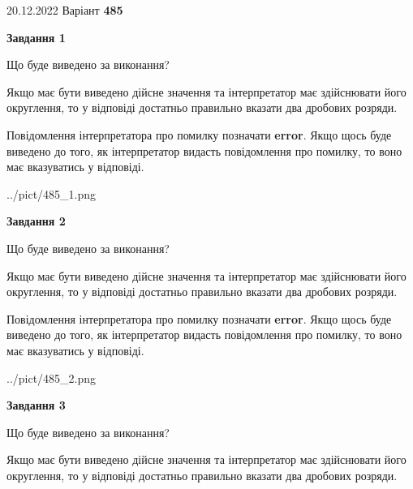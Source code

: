 \documentclass[12pt, ukrainian]{article}
\begin{document}
{20.12.2022 Варіант \No \textbf { 485 }\par}
{
\begin {Large}

{\begin {center}\textbf{Завдання 1}\end {center}}\par
Що буде виведено за виконання? \par

Якщо має бути виведено дійсне значення та інтерпретатор має здійснювати його округлення, 
то у відповіді достатньо правильно вказати два дробових розряди.

Повідомлення інтерпретатора про помилку позначати \textbf{error}.
Якщо щось буде виведено до того, як інтерпретатор видасть повідомлення про помилку, 
то воно має вказуватись у відповіді. \par

\begin{center}
	{../pict/485_1.png}
\end{center}
\newpage

{\begin {center}\textbf{Завдання 2}\end {center}}\par
Що буде виведено за виконання? \par

Якщо має бути виведено дійсне значення та інтерпретатор має здійснювати його округлення, 
то у відповіді достатньо правильно вказати два дробових розряди.

Повідомлення інтерпретатора про помилку позначати \textbf{error}.
Якщо щось буде виведено до того, як інтерпретатор видасть повідомлення про помилку, 
то воно має вказуватись у відповіді. \par

\begin{center}
	{../pict/485_2.png}
\end{center}
\newpage

{\begin {center}\textbf{Завдання 3}\end {center}}\par
Що буде виведено за виконання? \par

Якщо має бути виведено дійсне значення та інтерпретатор має здійснювати його округлення, 
то у відповіді достатньо правильно вказати два дробових розряди.


\end{Large}}
\end{document}
